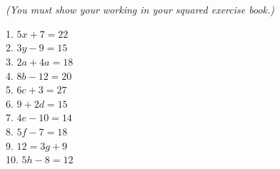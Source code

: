 \documentclass{article}
\date{}
\begin{document}
\fontsize{13}{15} \selectfont %

\begin{center}
  \qquad \\ 
\end{center} \\ 

\begin{center}
\vspace*{5pt} 
\textit{(You must show your working in your squared exercise book.)  }
\vspace{5pt}
\end{center}

1. \(5x + 7 = 22\) \\

2. \(3y - 9 = 15\) \\

3. \(2a + 4a = 18\) \\

4. \(8b - 12 = 20\) \\

5. \(6c + 3 = 27\) \\

6. \(9 + 2d = 15\) \\

7. \(4e - 10 = 14\) \\

8. \(5f - 7 = 18\) \\

9. \(12 = 3g + 9\) \\

10. \(5h - 8 = 12\) \\
\end{document}
